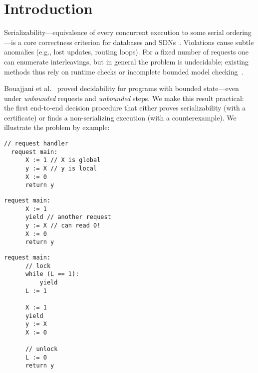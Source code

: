 \section{Introduction}
\label{sec:introduction}

Serializability—equivalence of every concurrent execution to some serial ordering—is a core correctness criterion for databases and SDNs~\cite{KrRaVePaRoAzUh14,XiWeFoNiXi15}. Violations cause subtle anomalies (e.g., lost updates, routing loops).
For a fixed number of requests one can enumerate interleavings, but in general the problem is undecidable; existing methods thus rely on runtime checks or incomplete bounded model checking~\cite{WaSt06a,WaSt06b,FlFrYi08,FaMa08,SiMaWaGu11a,SiMaWaGu11b,Pa79,AlMcPe96,BiEn19}.

Bouajjani et al.~\cite{BoEmEnHa13} proved decidability for programs with bounded state—even under \emph{unbounded} requests and \emph{unbounded} steps. We make this result practical: the first end-to-end decision procedure that either proves serializability (with a certificate) or finds a non-serializing execution (with a counterexample).
% 
We illustrate the problem by example:


\noindent
\begin{minipage}[t]{0.55\textwidth}
	\begin{minipage}[t]{\textwidth}
		\begin{lstlisting}[caption={Without yielding (serializable)},
			label={lst:MotivatingExample1Ser}]
  // request handler           
  request main: 
      X := 1 // X is global
      y := X // y is local
      X := 0
      return y 
		\end{lstlisting}
	\end{minipage}
	\vspace{1em}
	\begin{minipage}[t]{\textwidth}
		\begin{lstlisting}[caption={With yielding (not serializable)},
			label={lst:MotivatingExample2NonSer}]
  request main: 
      X := 1 
      yield // another request
      y := X // can read 0!
      X := 0
      return y 	
		\end{lstlisting}
	\end{minipage}
\end{minipage}%
\hfill
\begin{minipage}[t]{0.35\textwidth}
	\begin{lstlisting}[caption={With yielding and a spin-lock (serializable)},
		label={lst:MotivatingExample3Ser}]
  request main: 
      // lock
      while (L == 1): 
          yield
      L := 1 

      X := 1
      yield
      y := X 
      X := 0

      // unlock    
      L := 0
      return y 
	\end{lstlisting}
\end{minipage}

